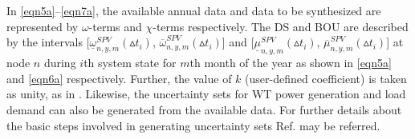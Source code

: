 \documentclass[journal]{IEEEtran}
\begin{document}
In \eqref{eqn5a}--\eqref{eqn7a}, the available annual data and data to be synthesized are represented by $\omega$-terms and $\chi$-terms respectively. The DS and BOU are described by the intervals [$\underline{\omega }_{n,y,m}^{SPV}(\vartriangle{{t}_{i}})$, $\overline{\omega }_{n,y,m}^{SPV}(\vartriangle{{t}_{i}})$] and [$\underline{\mu }_{n,y,m}^{SPV}(\vartriangle {{t}_{i}})$, $\overline{\mu }_{n,y,m}^{SPV}(\vartriangle {{t}_{i}})$] at node $n$ during $i$th system state for $m$th month of the year as shown in \eqref{eqn5a} and \eqref{eqn6a} respectively. Further, the value of $k$ (user-defined coefficient) is taken as unity, as in \cite{8272222}. Likewise, the uncertainty sets for WT power generation and load demand can also be generated from the available data. For further details about the basic steps involved in generating uncertainty sets Ref. \cite{wang2014robust,8272222,gorissen2015practical} may be referred.	
\end{document}
